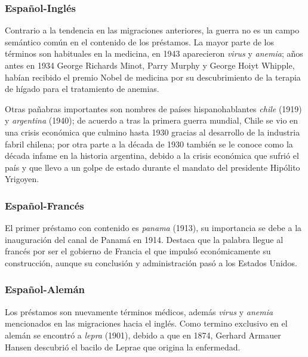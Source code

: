 \subsubsection*{Español-Inglés}%

Contrario a la tendencia en las migraciones anteriores, la guerra no es un campo semántico común en el contenido de los préstamos. La mayor parte de los términos son habituales en la medicina,  en 1943  aparecieron  \textit{virus} y \textit{anemia};  años antes en 1934 George Richards Minot, Parry Murphy y George Hoiyt Whipple, habían recibido el premio Nobel de medicina por su descubrimiento de la terapia de hígado para el tratamiento de anemias.   

Otras pañabras importantes son nombres de países hispanohablantes \textit{chile} (1919) y \textit{argentina} (1940); de acuerdo a \cite{crisis_chile} tras la primera guerra mundial, Chile se vio en una crisis económica  que culmino hasta 1930 gracias al desarrollo de la industria fabril chilena; por otra parte a la década de 1930 también se le conoce como la década infame en la historia argentina, debido a la crisis económica que sufrió el país  y que llevo a un golpe de estado durante el mandato del presidente Hipólito Yrigoyen. 

\subsubsection*{Español-Francés}%

El primer préstamo con contenido es \textit{panama} (1913), su importancia se debe a la inauguración del canal de Panamá en 1914. Destaca que la palabra llegue al francés por ser el gobierno de Francia el que impulsó económicamente su construcción, aunque su conclusión y administración pasó a los Estados Unidos.  




\subsubsection*{Español-Alemán}


Los préstamos son nuevamente términos médicos, además \textit{virus} y \textit{anemia} mencionados en las migraciones hacia el inglés. Como termino exclusivo en el alemán  se encontró a \textit{lepra} (1901), debido a que en 1874, Gerhard Armauer Hansen descubrió el bacilo de Leprae que origina la enfermedad.



